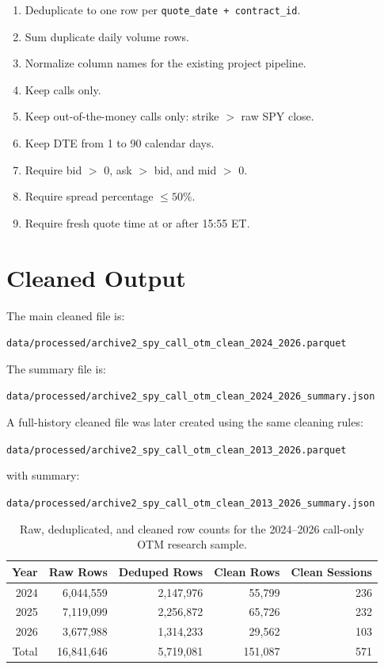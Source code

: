 \documentclass[11pt]{article}
\begin{document}
\begin{enumerate}
  \item Deduplicate to one row per \texttt{quote\_date + contract\_id}.
  \item Sum duplicate daily volume rows.
  \item Normalize column names for the existing project pipeline.
  \item Keep calls only.
  \item Keep out-of-the-money calls only: strike $>$ raw SPY close.
  \item Keep DTE from 1 to 90 calendar days.
  \item Require bid $>$ 0, ask $>$ bid, and mid $>$ 0.
  \item Require spread percentage $\leq 50\%$.
  \item Require fresh quote time at or after 15:55 ET.
\end{enumerate}

\section*{Cleaned Output}

The main cleaned file is:

\begin{center}
\texttt{data/processed/archive2\_spy\_call\_otm\_clean\_2024\_2026.parquet}
\end{center}

The summary file is:

\begin{center}
\texttt{data/processed/archive2\_spy\_call\_otm\_clean\_2024\_2026\_summary.json}
\end{center}

A full-history cleaned file was later created using the same cleaning rules:

\begin{center}
\texttt{data/processed/archive2\_spy\_call\_otm\_clean\_2013\_2026.parquet}
\end{center}

with summary:

\begin{center}
\texttt{data/processed/archive2\_spy\_call\_otm\_clean\_2013\_2026\_summary.json}
\end{center}

\begin{table}[h]
\centering
\begin{tabular}{rrrrr}
\toprule
Year & Raw Rows & Deduped Rows & Clean Rows & Clean Sessions \\
\midrule
2024 & 6,044,559 & 2,147,976 & 55,799 & 236 \\
2025 & 7,119,099 & 2,256,872 & 65,726 & 232 \\
2026 & 3,677,988 & 1,314,233 & 29,562 & 103 \\
\midrule
Total & 16,841,646 & 5,719,081 & 151,087 & 571 \\
\bottomrule
\end{tabular}
\caption{Raw, deduplicated, and cleaned row counts for the 2024--2026 call-only OTM research sample.}
\end{table}
\end{document}
